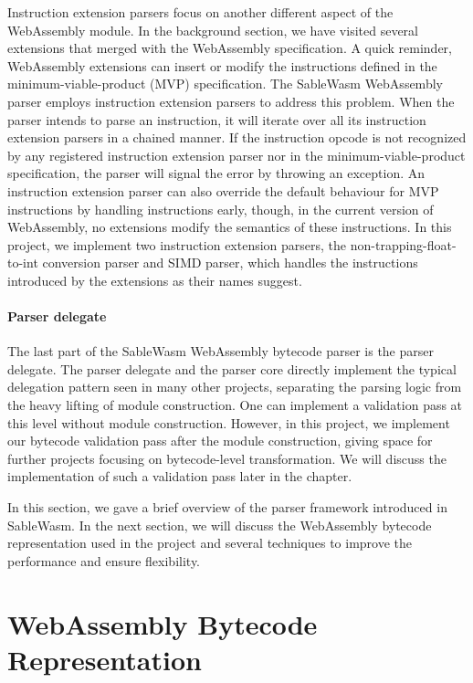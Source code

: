 Instruction extension parsers focus on another different aspect of the
WebAssembly module. In the background section, we have visited several
extensions that merged with the WebAssembly specification. A quick reminder,
WebAssembly extensions can insert or modify the instructions defined in the
minimum-viable-product (MVP) specification. The SableWasm WebAssembly parser
employs instruction extension parsers to address this problem. When the parser
intends to parse an instruction, it will iterate over all its instruction
extension parsers in a chained manner. If the instruction opcode is not
recognized by any registered instruction extension parser nor in the
minimum-viable-product specification, the parser will signal the error by
throwing an exception. An instruction extension parser can also override the
default behaviour for MVP instructions by handling instructions early,
though, in the current version of WebAssembly, no extensions modify the
semantics of these instructions. In this project, we implement two instruction
extension parsers, the non-trapping-float-to-int conversion parser and SIMD
parser, which handles the instructions introduced by the extensions as their
names suggest.

\paragraph{Parser delegate}
The last part of the SableWasm WebAssembly bytecode parser is the parser
delegate. The parser delegate and the parser core directly implement
the typical delegation pattern seen in many other projects, separating the
parsing logic from the heavy lifting of module construction. One can implement
a validation pass at this level without module construction. However, in this
project, we implement our bytecode validation pass after the module
construction, giving space for further projects focusing on bytecode-level
transformation. We will discuss the implementation of such a validation pass
later in the chapter.

In this section, we gave a brief overview of the parser framework introduced in
SableWasm. In the next section, we will discuss the WebAssembly bytecode
representation used in the project and several techniques to improve the
performance and ensure flexibility.

\section{WebAssembly Bytecode Representation}

